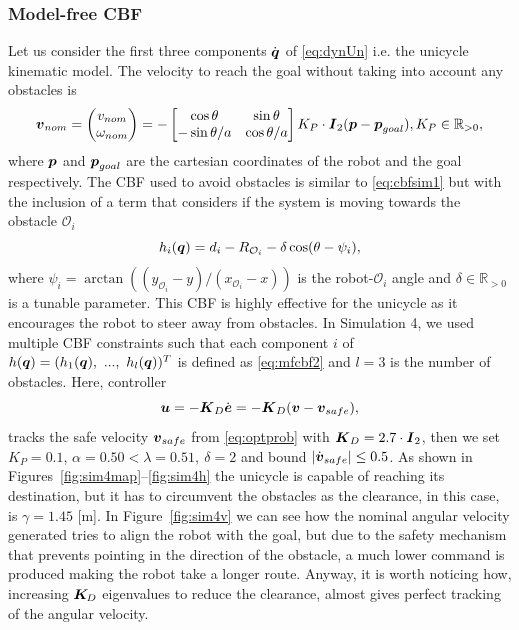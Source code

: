\subsubsection{Model-free CBF}
Let us consider  the first three components $\dot{\boldsymbol{q}}$ of \eqref{eq:dynUn} i.e. the unicycle kinematic model. The velocity to reach the goal without taking into account any obstacles is
\begin{equation}\label{eq:qnominalu}
    \boldsymbol{v}_{nom}= \begin{pmatrix}v_{nom} \\ \omega_{nom} \end{pmatrix} = -\begin{bmatrix}\cos\theta & \sin \theta\\ -\sin \theta /a & \cos \theta/a \end{bmatrix} K_P\cdot\boldsymbol{I}_{2} (\boldsymbol{p}-\boldsymbol{p}_{goal}), K_P \in \mathbb{R}_{>0},
\end{equation}
where $\boldsymbol{p}$ and $\boldsymbol{p}_{goal}$ are the cartesian coordinates of the robot and the goal respectively.
The CBF used to avoid obstacles is similar to \eqref{eq:cbfsim1} but with the inclusion of a term that considers if the system is moving towards the obstacle $\mathcal{O}_i$
\begin{equation}\label{eq:mfcbf2}
    h_i({\boldsymbol{q}}) = d_i-R_{\mathcal{O}_i}-\delta \cos(\theta - \psi_i),
\end{equation}
where $\psi_i= \arctan((y_{\mathcal{O}_i}-y)/(x_{\mathcal{O}_i}-x))$ is the robot-$\mathcal{O}_i$ angle and $\delta \in \mathbb{R}_{>0}$ is a tunable parameter. This CBF is highly effective for the unicycle as it encourages the robot to steer away from obstacles. In Simulation 4, we used multiple CBF constraints such that each component $i$ of $h({\boldsymbol{q}}) = (h_1({\boldsymbol{q}}),~...,~h_{l}({\boldsymbol{q}}))^T$ is defined as \eqref{eq:mfcbf2} and $l=3$ is the number of obstacles. 
Here, controller 
\begin{equation}
    \boldsymbol{u} = -\boldsymbol{K}_D \dot{\boldsymbol{e}} =  -\boldsymbol{K}_D(\boldsymbol{v}-\boldsymbol{v}_{safe}),
\end{equation}
tracks the safe velocity $\boldsymbol{v}_{safe}$ from \eqref{eq:optprob} with $\boldsymbol{K}_D=2.7\cdot\boldsymbol{I}_{2}$, then we set $K_P=0.1$, $\alpha = 0.50<\lambda=0.51,~\delta=2$ and bound $|\dot{\boldsymbol{v}}_{safe}| \leq 0.5$. As shown in Figures~\ref{fig:sim4map}--\ref{fig:sim4h} the unicycle is capable of reaching its destination, but it has to circumvent the obstacles as the clearance, in this case, is $\gamma=1.45$ [m]. In Figure~\ref{fig:sim4v} we can see how the nominal angular velocity generated tries to align the robot with the goal, but due to the safety mechanism that prevents pointing in the direction of the obstacle, a much lower command is produced making the robot take a longer route. Anyway, it is worth noticing how, increasing $\boldsymbol{K}_{\!D}$ eigenvalues to reduce the clearance, almost gives perfect tracking of the angular velocity.
